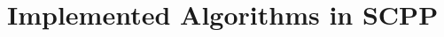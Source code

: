 \documentclass[twoside,11pt]{article}
\begin{document}
\pagebreak
















\section{Implemented Algorithms in SCPP}
\label{app:algorithms}
\end{document}
